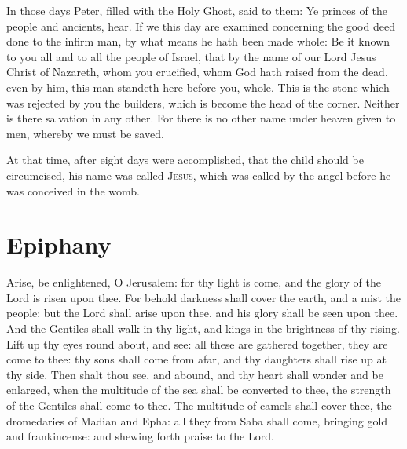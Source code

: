 \begin{multicols}{2}
\bigskip



In those days Peter, filled with the Holy Ghost, said to them: Ye princes of the people
and ancients, hear.  If we this day are examined concerning the good deed done
to the infirm man, by what means he hath been made whole: Be it known to you
all and to all the people of Israel, that by the name of our Lord Jesus Christ
of Nazareth, whom you crucified, whom God hath raised from the dead, even by
him, this man standeth here before you, whole.  This is the stone which was
rejected by you the builders, which is become the head of the corner.  Neither
is there salvation in any other. For there is no other name under heaven given
to men, whereby we must be saved.



At that time, after eight days were accomplished, that the child should be circumcised,
his name was called \textsc{Jesus}, which was called by the angel before he was
conceived in the womb.

\bigskip


\section{Epiphany}



Arise, be enlightened, O Jerusalem: for thy light is come, and the glory of the
Lord is risen upon thee.  For behold darkness shall cover the earth, and a mist
the people: but the Lord shall arise upon thee, and his glory shall be seen
upon thee.  And the Gentiles shall walk in thy light, and kings in the
brightness of thy rising.  Lift up thy eyes round about, and see: all these are
gathered together, they are come to thee: thy sons shall come from afar, and
thy daughters shall rise up at thy side.  Then shalt thou see, and abound, and
thy heart shall wonder and be enlarged, when the multitude of the sea shall be
converted to thee, the strength of the Gentiles shall come to thee.  The
multitude of camels shall cover thee, the dromedaries of Madian and Epha: all
they from Saba shall come, bringing gold and frankincense: and shewing forth
praise to the Lord.




\end{multicols}
